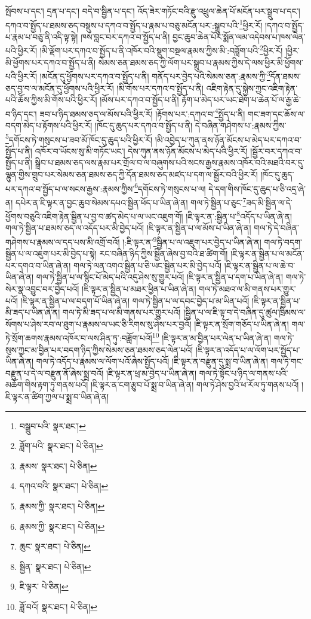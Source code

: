 སྤོབས་པ་དང་། དྲན་པ་དང་། བདེ་བ་སྦྱིན་པ་དང་། འོད་ཟེར་གཏོང་བའི་རྫུ་འཕྲུལ་ཆེན་པོ་མངོན་པར་སྒྲུབ་པ་དང་། དཀའ་བ་སྤྱོད་པ་ཐམས་ཅད་བསྡུས་པ་དཀའ་བ་སྤྱོད་པ་རྣམ་པ་བཅུ་མངོན་པར་:སྒྲུབ་པའི་\footnote{བསྒྲུབ་པའི་  སྣར་ཐང་། }ཕྱིར་རོ། །དཀའ་བ་སྤྱོད་པ་རྣམ་པ་བཅུ་ནི་འདི་ལྟ་སྟེ། ཁས་བླང་བར་དཀའ་བ་སྤྱོད་པ་ནི། བྱང་ཆུབ་ཆེན་པོར་སྨོན་ལམ་འདེབས་པ་ཁས་ལེན་པའི་ཕྱིར་རོ། །མི་ལྡོག་པར་དཀའ་བ་སྤྱོད་པ་ནི་འཁོར་བའི་སྡུག་བསྔལ་རྣམས་ཀྱིས་མི་:བཟློག་པའི་\footnote{ཟློག་པའི་  སྣར་ཐང་།  པེ་ཅིན། }ཕྱིར་རོ། །ཕྱིར་མི་ཕྱོགས་པར་དཀའ་བ་སྤྱོད་པ་ནི། སེམས་ཅན་ཐམས་ཅད་ཀྱི་ལོག་པར་སྒྲུབ་པ་རྣམས་ཀྱིས་དེ་ལས་ཕྱིར་མི་ཕྱོགས་པའི་ཕྱིར་རོ། །མངོན་དུ་ཕྱོགས་པར་དཀའ་བ་སྤྱོད་པ་ནི། གནོད་པར་བྱེད་པའི་སེམས་ཅན་:རྣམས་ཀྱི་\footnote{རྣམས་  སྣར་ཐང་།  པེ་ཅིན། }དོན་ཐམས་ཅད་བྱ་བ་ལ་མངོན་དུ་ཕྱོགས་པའི་ཕྱིར་རོ། །མི་གོས་པར་དཀའ་བ་སྤྱོད་པ་ནི། འཇིག་རྟེན་དུ་སྐྱེས་ཀྱང་འཇིག་རྟེན་པའི་ཆོས་ཀྱིས་མི་གོས་པའི་ཕྱིར་རོ། །མོས་པར་དཀའ་བ་སྤྱོད་པ་ནི། རྟོག་པ་མེད་པར་ཡང་ཐེག་པ་ཆེན་པོ་ལ་རྒྱ་ཆེ་བ་ཉིད་དང་། ཟབ་པ་ཉིད་ཐམས་ཅད་ལ་མོས་པའི་ཕྱིར་རོ། །རྟོགས་པར་:དཀའ་བ་\footnote{དཀའ་བའི་  སྣར་ཐང་།  པེ་ཅིན། }སྤྱོད་པ་ནི། གང་ཟག་དང་ཆོས་ལ་བདག་མེད་པ་རྟོགས་པའི་ཕྱིར་རོ། །ཁོང་དུ་ཆུད་པར་དཀའ་བ་སྤྱོད་པ་ནི། དེ་བཞིན་གཤེགས་པ་:རྣམས་ཀྱིས་\footnote{རྣམས་ཀྱི་  སྣར་ཐང་།  པེ་ཅིན། }དགོངས་ཏེ་གསུངས་པ་ཟབ་མོ་ཁོང་དུ་ཆུད་པའི་ཕྱིར་རོ། །མི་འབྱེད་པ་ཀུན་ནས་ཉོན་མོངས་པ་མེད་པར་དཀའ་བ་སྤྱོད་པ་ནི། འཁོར་བ་ཡོངས་སུ་མི་གཏོང་ཡང་། དེས་ཀུན་ནས་ཉོན་མོངས་པ་མེད་པའི་ཕྱིར་རོ། །སྦྱོར་བར་དཀའ་བ་སྤྱོད་པ་ནི། སྒྲིབ་པ་ཐམས་ཅད་ལས་རྣམ་པར་གྲོལ་བ་ལ་བཞུགས་པའི་སངས་རྒྱས་རྣམས་འཁོར་བའི་མཐའི་བར་དུ་ལྷུན་གྱིས་གྲུབ་པར་སེམས་ཅན་ཐམས་ཅད་ཀྱི་དོན་ཐམས་ཅད་མཛད་པ་དག་ལ་སྦྱོར་བའི་ཕྱིར་རོ། །ཁོང་དུ་ཆུད་པར་དཀའ་བ་སྤྱོད་པ་ལ་སངས་རྒྱས་:རྣམས་ཀྱིས་\footnote{རྣམས་ཀྱི་  སྣར་ཐང་།  པེ་ཅིན། }དགོངས་ཏེ་གསུངས་པ་ལ། དེ་དག་གིས་ཁོང་དུ་ཆུད་པ་ཅི་འདྲ་ཞེ་ན། དཔེར་ན་ཇི་ལྟར་ན་བྱང་ཆུབ་སེམས་དཔའ་སྦྱིན་ཕོད་པ་ཡིན་ཞེ་ན། གལ་ཏེ་སྦྱིན་པ་ཅུང་\footnote{ཆུང་  སྣར་ཐང་།  པེ་ཅིན། }ཟད་མི་སྦྱིན་ལ་དེ་ཕྱོགས་བཅུའི་འཇིག་རྟེན་སྦྱིན་པ་བྱ་བ་ཚད་མེད་པ་ལ་ཡང་འཇུག་གོ། །ཇི་ལྟར་ན་:སྦྱིན་པ་\footnote{སྦྱིན་  སྣར་ཐང་།  པེ་ཅིན། }འདོད་པ་ཡིན་ཞེ་ན། གལ་ཏེ་སྦྱིན་པ་ཐམས་ཅད་ལ་འདོད་པར་མི་བྱེད་པའོ། །ཇི་ལྟར་ན་སྦྱིན་པ་ལ་མོས་པ་ཡིན་ཞེ་ན། གལ་ཏེ་དེ་བཞིན་གཤེགས་པ་རྣམས་ལ་དད་པས་མི་འགྲོ་བའོ། །:ཇི་ལྟར་ན་\footnote{ཇི་ལྟར་  པེ་ཅིན། }སྦྱིན་པ་ལ་འཇུག་པར་བྱེད་པ་ཡིན་ཞེ་ན། གལ་ཏེ་བདག་སྦྱིན་པ་ལ་འཇུག་པར་མི་བྱེད་པ་སྟེ། རང་བཞིན་ཉིད་ཀྱིས་སྦྱིན་ཞེས་བྱ་བའི་ཐ་ཚིག་གོ། །ཇི་ལྟར་ན་སྦྱིན་པ་ལ་མངོན་པར་དགའ་བ་ཡིན་ཞེ་ན། གལ་ཏེ་ལན་འགའ་སྦྱིན་པ་ཅི་ཡང་སྦྱིན་པར་མི་བྱེད་པའོ། །ཇི་ལྟར་ན་སྦྱིན་པ་ལ་ཆེ་བ་ཡིན་ཞེ་ན། གལ་ཏེ་སྦྱིན་པ་ལ་སྙིང་པོ་མེད་པའི་འདུ་ཤེས་སུ་གྱུར་པའོ། །ཇི་ལྟར་ན་སྦྱིན་པ་དག་པ་ཡིན་ཞེ་ན། གལ་ཏེ་སེར་སྣ་འབྱུང་བར་བྱེད་པའོ། །ཇི་ལྟར་ན་སྦྱིན་པ་མཐར་ཕྱིན་པ་ཡིན་ཞེ་ན། གལ་ཏེ་མཐའ་ལ་མི་གནས་པར་གྱུར་པའོ། །ཇི་ལྟར་ན་སྦྱིན་པ་ལ་བདག་པོ་ཡིན་ཞེ་ན། གལ་ཏེ་སྦྱིན་པ་ལ་དབང་བྱེད་པ་མ་ཡིན་པའོ། །ཇི་ལྟར་ན་སྦྱིན་པ་མི་ཟད་པ་ཡིན་ཞེ་ན། གལ་ཏེ་མི་ཟད་པ་ལ་མི་གནས་པར་གྱུར་པའོ། །སྦྱིན་པ་ལ་ཇི་ལྟ་བ་དེ་བཞིན་དུ་ཚུལ་ཁྲིམས་ལ་སོགས་པ་ཤེས་རབ་ལ་ཐུག་པ་རྣམས་ལ་ཡང་ཅི་རིགས་སུ་ཤེས་པར་བྱའོ། །ཇི་ལྟར་ན་སྲོག་གཅོད་པ་ཡིན་ཞེ་ན། གལ་ཏེ་སྲོག་ཆགས་རྣམས་འཁོར་བ་ལས་ཤིན་ཏུ་:བཟློག་པའོ།\footnote{ཟློ་བའོ།  སྣར་ཐང་།  པེ་ཅིན། } །ཇི་ལྟར་ན་མ་བྱིན་པར་ལེན་པ་ཡིན་ཞེ་ན། གལ་ཏེ་སུས་ཀྱང་མ་བྱིན་པར་བདག་ཉིད་ཀྱིས་སེམས་ཅན་ཐམས་ཅད་ལེན་པའོ། །ཇི་ལྟར་ན་འདོད་པ་ལ་ལོག་པར་སྤྱོད་པ་ཡིན་ཞེ་ན། གལ་ཏེ་འདོད་པ་རྣམས་ལ་ལོག་པའོ་ཞེས་སྤྱོད་པའོ། །ཇི་ལྟར་ན་བརྫུན་དུ་སྨྲ་བ་ཡིན་ཞེ་ན། གལ་ཏེ་གང་བརྫུན་པ་དེ་ལ་བརྫུན་ནོ་ཞེས་སྨྲ་བའོ། །ཇི་ལྟར་ན་ཕྲ་མ་བྱེད་པ་ཡིན་ཞེ་ན། གལ་ཏེ་སྟོང་པ་ཉིད་ལ་གནས་པའི་མཆོག་གིས་རྟག་ཏུ་གནས་པའོ། །ཇི་ལྟར་ན་ངག་རྩུབ་པོ་སྨྲ་བ་ཡིན་ཞེ་ན། གལ་ཏེ་ཤེས་བྱའི་ཕ་རོལ་ཏུ་གནས་པའོ། །ཇི་ལྟར་ན་ཚིག་ཀྱལ་པ་སྨྲ་བ་ཡིན་ཞེ་ན། 